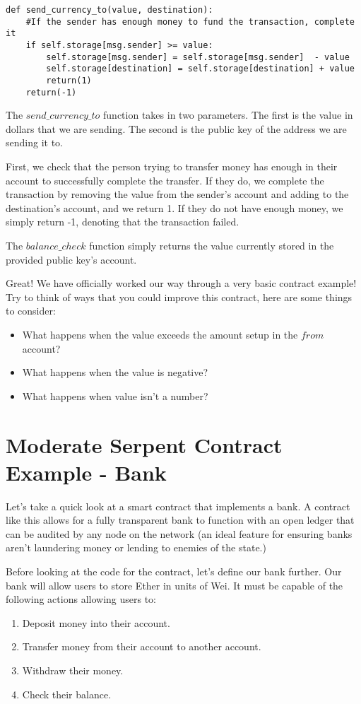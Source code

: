 \documentclass[12pt]{article}
\begin{document}
\begin{verbatim}
def send_currency_to(value, destination):
	#If the sender has enough money to fund the transaction, complete it
	if self.storage[msg.sender] >= value:
		self.storage[msg.sender] = self.storage[msg.sender]  - value
		self.storage[destination] = self.storage[destination] + value
		return(1)
	return(-1)
\end{verbatim}

The $send\_currency\_to$ function takes in two parameters. The first is the value in dollars that we are sending. The second is the public key of the address we are sending it to. 

First, we check that the person trying to transfer money has enough in their account to successfully complete the transfer. If they do, we complete the transaction by removing the value from the sender's account and adding to the destination's account, and we return 1. If they do not have enough money, we simply return -1, denoting that the transaction failed. 

The $balance\_check$ function simply returns the value currently stored in the provided public key's account. 

Great! We have officially worked our way through a very basic contract example! Try to think of ways that you could improve this contract, here are some things to consider:

\begin{itemize}
\item What happens when the value exceeds the amount setup in the $from$ account?
\item What happens when the value is negative?
\item What happens when value isn't a number?
\end{itemize}

\cite{KenK'sFirstContractTutorial}

\section{Moderate Serpent Contract Example - Bank}

Let's take a quick look at a smart contract that implements a bank. A contract like this allows for a fully transparent bank to function with an open ledger that can be audited by any node on the network (an ideal feature for ensuring banks aren't laundering money or lending to enemies of the state.)

Before looking at the code for the contract, let's define our bank further. Our bank will allow users to store Ether in units of Wei. It must be capable of the following actions allowing users to:
\begin{enumerate}
\item Deposit money into their account.
\item Transfer money from their account to another account.
\item Withdraw their money.
\item Check their balance.
\end{enumerate}
\end{document}
